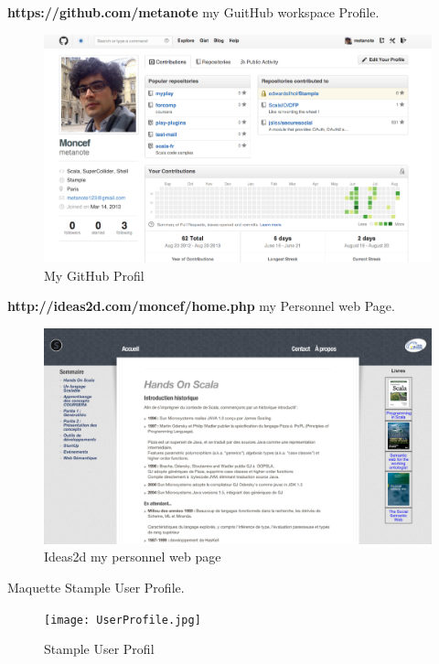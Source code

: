 \newpage
\textbf{https://github.com/metanote} my GuitHub workspace Profile.
\begin{figure}[H]
        \centering
                \centering
                \includegraphics[width=\textwidth]{gitProfile.png}
               \caption{My GitHub Profil}

\end{figure}
\textbf{http://ideas2d.com/moncef/home.php} my Personnel web Page.
\begin{figure}[H]
        \centering
                \centering
                \includegraphics[width=\textwidth]{idea2d.png}
               \caption{Ideas2d my personnel web page}

\end{figure}
\newpage
Maquette Stample User Profile.
\begin{figure}[H]
        \centering
                \centering
                \texttt{[image: UserProfile.jpg]}
               \caption{Stample User Profil}

\end{figure}